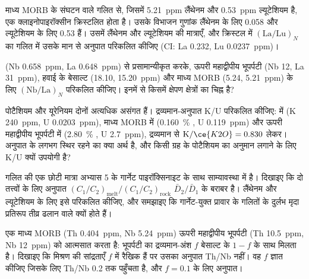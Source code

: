 \begin{exercise}[$\star\star$]\label{exo:b2:elements-in-the-earth:7}
माध्य MORB के संघटन वाले गलित से, जिसमें
\qty{5.21}{ppm} लैंथेनम और \qty{0.53}{ppm} ल्यूटेशियम है, एक क्लाइनोपाइरॉक्सीन क्रिस्टलित होता है। उसके विभाजन
गुणांक लैंथेनम के लिए 0.058 और ल्यूटेशियम के लिए 0.53 हैं। उसमें
लैंथेनम और ल्यूटेशियम की मात्राएँ, और क्रिस्टल में $(\mathrm{La}/\mathrm{Lu})_N$ का
गलित में उसके मान से अनुपात परिकलित कीजिए (CI: La 0.232, Lu \qty{0.0237}{ppm})।
\end{exercise}

\begin{exercise}[$\star\star$]\label{exo:b2:elements-in-the-earth:8}
 (Nb \qty{0.658}{ppm}, La \qty{0.648}{ppm}) से प्रसामान्यीकृत करके,
ऊपरी महाद्वीपीय भूपर्पटी (Nb 12,
La \qty{31}{ppm}), हवाई के बेसाल्ट (18.10, \qty{15.20}{ppm}) और माध्य MORB
(5.24, \qty{5.21}{ppm}) के लिए $(\mathrm{Nb}/\mathrm{La})_N$ परिकलित कीजिए। इनमें से किसमें क्षेपण क्षेत्रों का चिह्न है?
\end{exercise}

\begin{exercise}[$\star\star$]\label{exo:b2:elements-in-the-earth:9}
पोटैशियम और यूरेनियम दोनों अत्यधिक असंगत हैं। द्रव्यमान-अनुपात K/U परिकलित कीजिए:
 में (K \qty{240}{ppm}, U \qty{0.0203}{ppm}), माध्य MORB में
(\qty{0.160}{\percent} , U \qty{0.119}{ppm}) और ऊपरी महाद्वीपीय
भूपर्पटी में (\qty{2.80}{\percent} , U \qty{2.7}{ppm}), द्रव्यमान से
$\mathrm{K}/\ce{K2O} = 0.830$ लेकर। अनुपात के लगभग स्थिर रहने का क्या
अर्थ है, और किसी ग्रह के पोटैशियम का अनुमान लगाने के लिए K/U क्यों उपयोगी है?
\end{exercise}

\begin{exercise}[$\star\star\star$]\label{exo:b2:elements-in-the-earth:10}
गलित की एक छोटी मात्रा अभ्यास 5 के गार्नेट पाइरॉक्सिनाइट के साथ साम्यावस्था में
है। दिखाइए कि दो तत्त्वों के लिए अनुपात
$(C_1/C_2)_{\mathrm{melt}}/(C_1/C_2)_{\mathrm{rock}}$
$\bar D_2/\bar D_1$ के बराबर है। लैंथेनम और ल्यूटेशियम के लिए इसे परिकलित कीजिए, और समझाइए कि
गार्नेट-युक्त प्रावार के गलितों के दुर्लभ मृदा प्रतिरूप तीव्र ढलान वाले क्यों होते हैं।
\end{exercise}

\begin{exercise}[$\star\star\star$]\label{exo:b2:elements-in-the-earth:11}
एक माध्य MORB (Th \qty{0.404}{ppm}, Nb \qty{5.24}{ppm}) ऊपरी
महाद्वीपीय भूपर्पटी (Th \qty{10.5}{ppm}, Nb \qty{12}{ppm}) को आत्मसात करता है: भूपर्पटी का द्रव्यमान-अंश $f$
बेसाल्ट के $1-f$ के साथ मिलता है। दिखाइए कि मिश्रण की सांद्रताएँ
$f$ में रैखिक हैं पर उसका अनुपात Th/Nb नहीं। वह $f$ ज्ञात कीजिए जिसके लिए Th/Nb
0.2 तक पहुँचता है, और $f = 0.1$ के लिए अनुपात।
\end{exercise}

